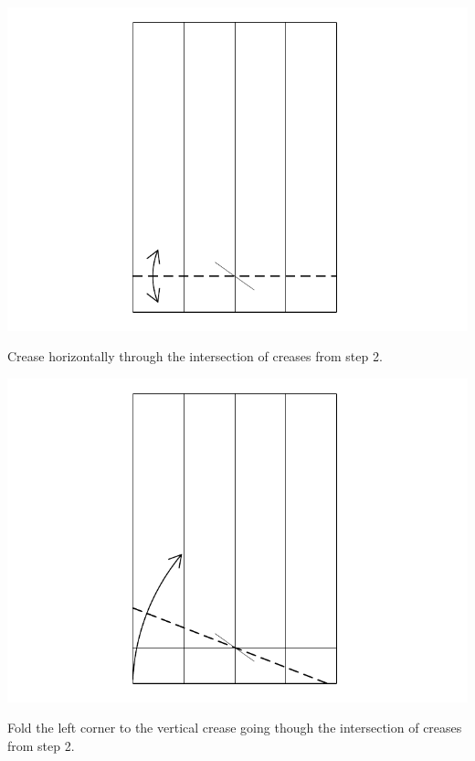 \documentclass[11pt]{article}
\begin{document}
\begin{minipage}[t]{0.45\textwidth}
  \includegraphics[width=\textwidth]{../figs/fig08-04}
  \begin{itemize}{\item[4.] Crease horizontally through the intersection of creases from step 2.}\end{itemize}
\end{minipage}
\hfill
\begin{minipage}[t]{0.45\textwidth}
  \includegraphics[width=\textwidth]{../figs/fig08-05}
  \begin{itemize}{\item[5.] Fold the left corner to the  vertical crease going though the intersection of creases from step 2.}\end{itemize}
\end{minipage}
\end{document}
